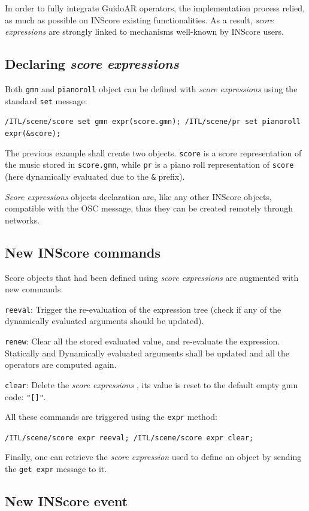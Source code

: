\documentclass{article}
\newcommand{\OSC}[1]{\texttt{#1}}
\newcommand{\sExpr}{\emph{score expressions} }
\newcommand{\SExpr}{\emph{Score expressions} }
\let\olditemize\itemize
\let\oldenditemize\enditemize
\renewenvironment{itemize} 	{\olditemize \setlength{\itemsep}{1mm}}{\oldenditemize}
\newcommand{\sample}	[1]			{\vspace{-1.8em}\begin{center}\colorbox{mygrey}{\begin{minipage}[t]{1\columnwidth} {\small \texttt{#1}}\end{minipage}}\end{center}}
\begin{document}
In order to fully integrate GuidoAR operators, the implementation process relied, as much as possible on INScore existing functionalities. As a result, \sExpr are strongly linked to mechanisms well-known by INScore users.

\subsection{Declaring \sExpr}
Both \OSC{gmn} and \OSC{pianoroll} object can be defined with \sExpr using the standard \OSC{set} message:
\sample{/ITL/scene/score set gmn expr(score.gmn);
/ITL/scene/pr set pianoroll expr(\&score);
}

The previous example shall create two objects. \OSC{score} is a score representation of the music stored in \OSC{score.gmn}, while \OSC{pr} is a piano roll representation of \OSC{score} (here dynamically evaluated due to the \OSC{\&} prefix).

\SExpr objects declaration are, like any other INScore objects, compatible with the OSC message, thus they can be created remotely through networks. 

\subsection{New INScore commands}
Score objects that had been defined using \sExpr are augmented with new commands.

\begin{itemize}
\item \OSC{reeval}: Trigger the re-evaluation of the expression tree (check if any of the dynamically evaluated arguments should be updated).
\item \OSC{renew}: Clear all the stored evaluated value, and re-evaluate the expression. Statically and Dynamically evaluated arguments shall be updated and all the operators are computed again.
\item \OSC{clear}: Delete the \sExpr, its value is reset to the default empty gmn code: \OSC{"[]"}.
\end{itemize}

All these commands are triggered using the \OSC{expr} method:\sample{/ITL/scene/score expr reeval;
/ITL/scene/score expr clear;
}

Finally, one can retrieve the \emph{score expression} used to define an object by sending the \OSC{get expr} message to it. 

\subsection{New INScore event}
\end{document}
